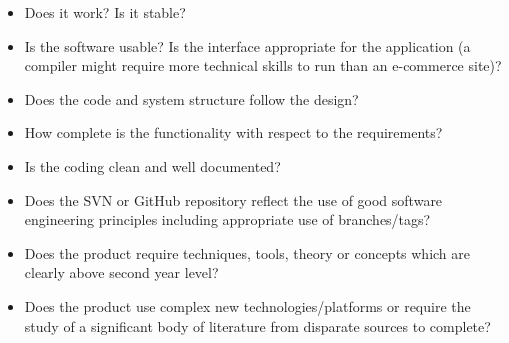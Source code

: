 \documentclass[11pt]{article}
\begin{document}
\begin{itemize}
\item Does it work? Is it stable?
\item Is the software usable? Is the interface appropriate for the application (a compiler might require more
   technical skills to run than an e-commerce site)?
\item Does the code and system structure follow the design?
\item How complete is the functionality with respect to the requirements?
\item Is the coding clean and well documented?
\item Does the SVN or GitHub repository reflect the use of good software engineering principles including appropriate use of branches/tags?

\item Does the product require techniques, tools, theory or concepts which are clearly above second year level?
\item Does the product use complex new technologies/platforms or require the study of a significant body of literature from disparate sources to complete?

\end{itemize}
\end{document}
